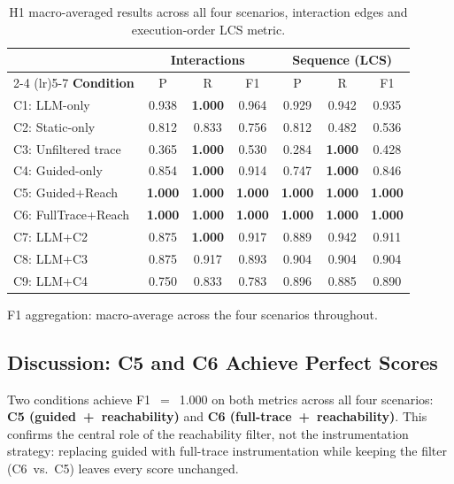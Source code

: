 \begin{table}[htb]
\centering
\caption{H1 macro-averaged results across all four scenarios, interaction
  edges and execution-order LCS metric.}
\label{tab:h1-results}
\small
\begin{tabular}{@{} l ccc ccc @{}}
\toprule
& \multicolumn{3}{c}{\textbf{Interactions}}
& \multicolumn{3}{c}{\textbf{Sequence (LCS)}} \\
\cmidrule(lr){2-4} \cmidrule(lr){5-7}
\textbf{Condition} & P & R & F1 & P & R & F1 \\
\midrule
C1: LLM-only          & 0.938 & \textbf{1.000} & 0.964 & 0.929 & 0.942 & 0.935 \\
C2: Static-only       & 0.812 & 0.833 & 0.756 & 0.812 & 0.482 & 0.536 \\
C3: Unfiltered trace  & 0.365 & \textbf{1.000} & 0.530 & 0.284 & \textbf{1.000} & 0.428 \\
C4: Guided-only       & 0.854 & \textbf{1.000} & 0.914 & 0.747 & \textbf{1.000} & 0.846 \\
C5: Guided+Reach      & \textbf{1.000} & \textbf{1.000} & \textbf{1.000} & \textbf{1.000} & \textbf{1.000} & \textbf{1.000} \\
C6: FullTrace+Reach   & \textbf{1.000} & \textbf{1.000} & \textbf{1.000} & \textbf{1.000} & \textbf{1.000} & \textbf{1.000} \\
C7: LLM+C2            & 0.875 & \textbf{1.000} & 0.917 & 0.889 & 0.942 & 0.911 \\
C8: LLM+C3            & 0.875 & 0.917 & 0.893 & 0.904 & 0.904 & 0.904 \\
C9: LLM+C4            & 0.750 & 0.833 & 0.783 & 0.896 & 0.885 & 0.890 \\
\bottomrule
\end{tabular}
\end{table}

F1 aggregation: macro-average across the four scenarios throughout.

\subsection{Discussion: C5 and C6 Achieve Perfect Scores}\label{sec:h1-c4c2}

Two conditions achieve F1~$=$~1.000 on both metrics across all four
scenarios: \textbf{C5 (guided~+~reachability)} and \textbf{C6
(full-trace~+~reachability)}. This confirms the central role of the
reachability filter, not the instrumentation strategy: replacing guided
with full-trace instrumentation while keeping the filter (C6~vs.~C5)
leaves every score unchanged.

